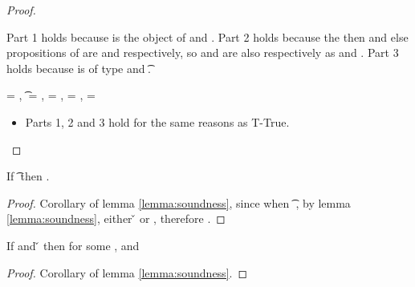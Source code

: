 \begin{lemma}
\begin{proof}
\begin{case}[T-Subsume]
Part 1 holds because \objectp{} is the object of \e{}
and \inpropenv {} {\issubtype {\objectp{}} {\object{}}}.
Part 2 holds because 
the then and else propositions of \e{} are
{\thenprop {\propp{}}} and 
{\elseprop {\propp{}}} respectively, so
{\thenprop {\prop{}}} and
{\elseprop {\prop{}}} are also respectively as 
\inpropenv {\propenv{}, {\thenprop {\propp{}}}} {\thenprop {\prop{}}} and
\inpropenv {\propenv{}, {\elseprop {\propp{}}}} {\elseprop {\prop{}}}.
Part 3 holds because \e{} is of type \tp{} and 
\inpropenv {} {\issubtype {\tp{}} {\t{}}}.

\end{case}

\begin{case}[T-Const]\e{} = {\const{}},
  \t{} = {\constanttype{\const{}}},
{\thenprop{\prop{}}} = {\topprop{}},
{\elseprop{\prop{}}} = {\botprop{}},
{\object{}} = {\emptyobject{}}

  \begin{itemize}
    \item[] 
      \begin{subcase}[B-Val]
        Parts 1, 2 and 3 hold for the same reasons as T-True. 
      \end{subcase}
  \end{itemize}
\end{case}

\end{proof}

\end{lemma}

\begin{theorem} \label{theorem:wrong}
  If {\judgement {} {\hastype {\e{}} {\t{}}} {\filterset {\thenprop{\prop{}}}{\elseprop{\prop{}}}} {\object{}}}
  then \notopsem{}{\e{}}{\wrong{}}.

\begin{proof}
  Corollary of lemma \ref{lemma:soundness}, since 
  when {\judgement {} {\hastype {\e{}} {\t{}}} {\filterset {\thenprop{\prop{}}}{\elseprop{\prop{}}}} {\object{}}}
    , by lemma \ref{lemma:soundness}, either
    \opsem {} {\e{}} {\v{}} or
    \opsem {} {\e{}} {\errorvalv{}}, therefore \notopsem{}{\e{}}{\wrong{}}.
\end{proof}
\end{theorem}

\begin{theorem} \label{theorem:soundness}
If \judgement{\propenv{}}{\hastype{\e{}}{\t{}}}{\filterset{\thenprop{\prop{}}}{\elseprop{\prop{}}}}{\object{}}
and \opsem {\openv{}} {\e{}} {\v{}} 
then \judgement{}{\hastype{\v{}}{\t{}}}{\filterset{\thenprop{\propp{}}}{\elseprop{\propp{}}}}{\objectp{}}
        for some \thenprop{\propp{}}, \elseprop{\propp{}} and {\objectp{}}

\begin{proof}
  Corollary of lemma \ref{lemma:soundness}.
\end{proof}

\end{theorem}
